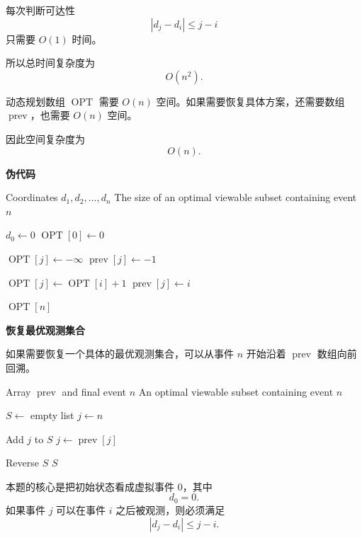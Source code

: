 \documentclass[12pt,a4paper]{article}
\begin{document}
\begin{answerbox}
每次判断可达性
\[
|d_j-d_i|\le j-i
\]
只需要 $O(1)$ 时间。

所以总时间复杂度为
\[
O(n^2).
\]

动态规划数组 $\operatorname{OPT}$ 需要 $O(n)$ 空间。如果需要恢复具体方案，还需要数组 $\operatorname{prev}$，也需要 $O(n)$ 空间。

因此空间复杂度为
\[
O(n).
\]

\textbf{伪代码}

\begin{algorithm}[H]
\caption{Optimal Astronomy Schedule}
\begin{algorithmic}[1]
\Require Coordinates $d_1,d_2,\ldots,d_n$
\Ensure The size of an optimal viewable subset containing event $n$

\State $d_0\gets 0$
\State $\operatorname{OPT}[0]\gets 0$

    \State $\operatorname{OPT}[j]\gets -\infty$
    \State $\operatorname{prev}[j]\gets -1$

                \State $\operatorname{OPT}[j]\gets \operatorname{OPT}[i]+1$
                \State $\operatorname{prev}[j]\gets i$
            \EndIf
        \EndIf
    \EndFor
\EndFor

\State \Return $\operatorname{OPT}[n]$

\end{algorithmic}
\end{algorithm}

\textbf{恢复最优观测集合}

如果需要恢复一个具体的最优观测集合，可以从事件 $n$ 开始沿着 $\operatorname{prev}$ 数组向前回溯。

\begin{algorithm}[H]
\caption{Recover Optimal Schedule}
\begin{algorithmic}[1]
\Require Array $\operatorname{prev}$ and final event $n$
\Ensure An optimal viewable subset containing event $n$

\State $S\gets$ empty list
\State $j\gets n$

    \State Add $j$ to $S$
    \State $j\gets \operatorname{prev}[j]$
\EndWhile

\State Reverse $S$
\State \Return $S$

\end{algorithmic}
\end{algorithm}


本题的核心是把初始状态看成虚拟事件 $0$，其中
\[
d_0=0.
\]
如果事件 $j$ 可以在事件 $i$ 之后被观测，则必须满足
\[
|d_j-d_i|\le j-i.
\]


\end{answerbox}
\end{document}
